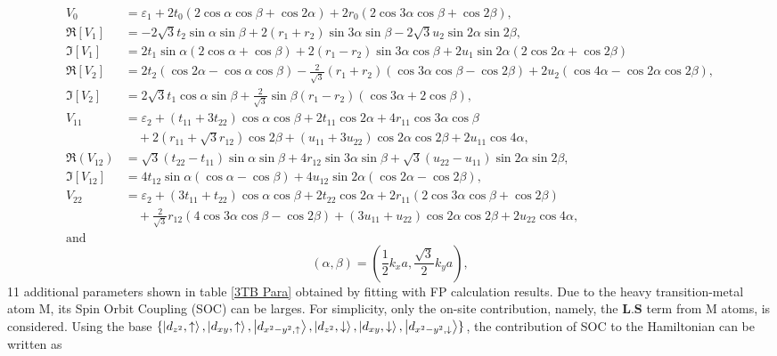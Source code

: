 \documentclass[12pt,english,a4paper]{article}
\begin{document}
	\begin{align*}
		V_0 &= \varepsilon_1 + 2t_0 (2\cos\alpha\cos\beta + \cos2\alpha) + 2r_0 (2\cos3\alpha\cos\beta+\cos2\beta),\\
		\Re[V_1]&= -2\sqrt{3}t_2 \sin \alpha \sin \beta + 2(r_1 + r_2)\sin 3 \alpha \sin \beta - 2\sqrt{3} u_2 \sin 2\alpha \sin 2\beta,\\
		\Im[V_1] &= 2 t_1 \sin \alpha (2 \cos \alpha +\cos \beta) + 2(r_1 - r_2) \sin 3\alpha \cos \beta + 2u_1 \sin 2\alpha (2\cos 2\alpha + \cos 2\beta)\\
		\Re[V_2] &= 2t_2 (\cos 2\alpha - \cos \alpha \cos \beta) -\frac{2}{\sqrt{3}} (r_1 + r_2 ) (\cos 3\alpha \cos \beta - \cos 2 \beta) + 2u_2 (\cos 4\alpha -\cos 2\alpha \cos 2\beta),\\
		\Im[V_2] &= 2\sqrt{3} t_1 \cos \alpha \sin \beta +\frac{2}{\sqrt{3}} \sin \beta (r_1 -r_2 )(\cos 3\alpha + 2\cos \beta),\\
		V_{11} & = \varepsilon_2 + (t_{11}+3t_{22})\cos \alpha \cos \beta + 2 t_{11} \cos 2\alpha + 4r_{11} \cos 3\alpha \cos \beta \\ &\quad +2 (r_{11} + \sqrt{3} r_{12}) \cos 2\beta + (u_{11} + 3 u_{22})\cos 2 \alpha \cos 2\beta + 2 u_{11} \cos 4\alpha,\\
		\Re(V_{12}) &= \sqrt{3} (t_{22} - t_{11}) \sin \alpha \sin \beta +4 r_{12} \sin 3\alpha \sin \beta + \sqrt{3} (u_{22} - u_{11}) \sin 2\alpha \sin 2\beta,\\
		\Im[V_{12}] &= 4 t_{12} \sin \alpha (\cos \alpha -\cos \beta) + 4u_{12} \sin 2\alpha (\cos 2\alpha - \cos 2\beta),\\
		V_{22} &= \varepsilon_2 +(3t_{11} + t_{22}) \cos \alpha \cos \beta + 2 t_{22} \cos 2 \alpha + 2 r_{11}(2\cos 3\alpha \cos \beta + \cos 2 \beta) \\&\quad + \frac{2}{\sqrt{3}} r_{12} (4\cos 3\alpha \cos \beta - \cos 2\beta) + (3 u_{11} + u_{22}) \cos 2\alpha \cos 2\beta + 2u_{22} \cos 4\alpha,\\
		\text{and}&
		\end{align*}
		\begin{equation}		
			(\alpha,\beta) =  (\frac{1}{2}k_x a, \frac{\sqrt{3}}{2}k_y a),
		\end{equation}
	11 additional parameters shown in table \ref{3TB Para} obtained by fitting with FP calculation results. Due to the heavy transition-metal atom M, its Spin Orbit Coupling (SOC) can be larges. For simplicity, only the on-site contribution, namely, the $\textbf{L}.\textbf{S}$ term from M atoms, is considered. Using the base $\{\ket{d_{z^2},\uparrow},\ket{d_{xy},\uparrow},\ket{d_{x^2-y^2,\uparrow}},\ket{d_{z^2},\downarrow},\ket{d_{xy},\downarrow},\ket{d_{x^2-y^2,\downarrow}}\}$, the contribution of SOC to the Hamiltonian can be written as
\end{document}
